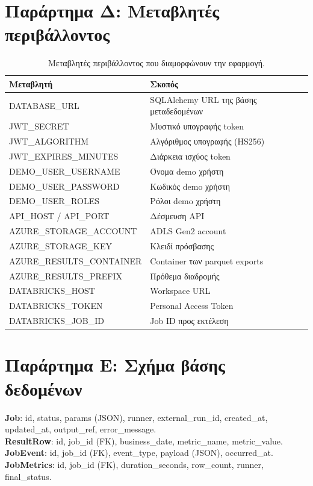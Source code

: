 \documentclass[12pt]{article}
\begin{document}
\section{Παράρτημα Δ: Μεταβλητές περιβάλλοντος}
\begin{table}[H]
\centering
\small
\begin{tabular}{ll}
\hline
Μεταβλητή & Σκοπός \\ \hline
DATABASE\_URL                & SQLAlchemy URL της βάσης μεταδεδομένων \\
JWT\_SECRET                  & Μυστικό υπογραφής token \\
JWT\_ALGORITHM               & Αλγόριθμος υπογραφής (HS256) \\
JWT\_EXPIRES\_MINUTES        & Διάρκεια ισχύος token \\
DEMO\_USER\_USERNAME         & Όνομα demo χρήστη \\
DEMO\_USER\_PASSWORD         & Κωδικός demo χρήστη \\
DEMO\_USER\_ROLES            & Ρόλοι demo χρήστη \\
API\_HOST / API\_PORT        & Δέσμευση API \\
AZURE\_STORAGE\_ACCOUNT      & ADLS Gen2 account \\
AZURE\_STORAGE\_KEY          & Κλειδί πρόσβασης \\
AZURE\_RESULTS\_CONTAINER    & Container των parquet exports \\
AZURE\_RESULTS\_PREFIX       & Πρόθεμα διαδρομής \\
DATABRICKS\_HOST             & Workspace URL \\
DATABRICKS\_TOKEN            & Personal Access Token \\
DATABRICKS\_JOB\_ID          & Job ID προς εκτέλεση \\ \hline
\end{tabular}
\caption{Μεταβλητές περιβάλλοντος που διαμορφώνουν την εφαρμογή.}
\label{tab:env}
\end{table}

\section{Παράρτημα Ε: Σχήμα βάσης δεδομένων}
\textbf{Job}: id, status, params (JSON), runner, external\_run\_id, created\_at, updated\_at, output\_ref, error\_message.\\
\textbf{ResultRow}: id, job\_id (FK), business\_date, metric\_name, metric\_value.\\
\textbf{JobEvent}: id, job\_id (FK), event\_type, payload (JSON), occurred\_at.\\
\textbf{JobMetrics}: id, job\_id (FK), duration\_seconds, row\_count, runner, final\_status.
\end{document}
